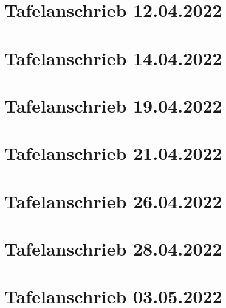 \documentclass[a4paper,12pt]{article}
\begin{document}
\tableofcontents
\newpage
\section{Tafelanschrieb 12.04.2022}

\newpage
\section{Tafelanschrieb 14.04.2022}

\section{Tafelanschrieb 19.04.2022}

\section{Tafelanschrieb 21.04.2022}

\newpage
\section{Tafelanschrieb 26.04.2022}

\newpage
\section{Tafelanschrieb 28.04.2022}

\newpage
\section{Tafelanschrieb 03.05.2022}

\end{document}

